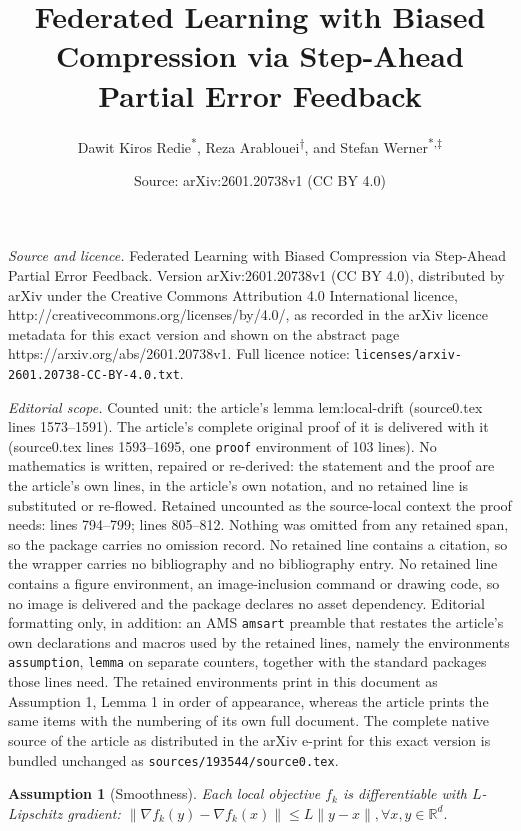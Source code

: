 \documentclass[10pt,a4paper]{amsart}
\title{Federated Learning with Biased Compression via Step-Ahead Partial Error Feedback}
\author{Dawit Kiros Redie\textsuperscript{*}, Reza Arablouei\textsuperscript{$\dagger$}, and Stefan Werner\textsuperscript{*,$\ddagger$}}
\date{Source: arXiv:2601.20738v1 (CC BY 4.0)}
\newtheorem{assumption}{Assumption}
\begin{document}
\maketitle

\noindent\emph{Source and licence.} Federated Learning with Biased Compression via Step-Ahead Partial Error Feedback. Version arXiv:2601.20738v1 (CC BY 4.0), distributed by arXiv under the Creative Commons Attribution 4.0 International licence, http://creativecommons.org/licenses/by/4.0/, as recorded in the arXiv licence metadata for this exact version and shown on the abstract page https://arxiv.org/abs/2601.20738v1. Full licence notice: \texttt{licenses/arxiv-2601.20738-CC-BY-4.0.txt}.\par\smallskip

\noindent\textit{Editorial scope.} Counted unit: the article's lemma lem:local-drift (source0.tex lines 1573--1591). The article's complete original proof of it is delivered with it (source0.tex lines 1593--1695, one \texttt{proof} environment of 103 lines). No mathematics is written, repaired or re-derived: the statement and the proof are the article's own lines, in the article's own notation, and no retained line is substituted or re-flowed.  Retained uncounted as the source-local context the proof needs: lines 794--799; lines 805--812.  Nothing was omitted from any retained span, so the package carries no omission record.  No retained line contains a citation, so the wrapper carries no bibliography and no bibliography entry.  No retained line contains a figure environment, an image-inclusion command or drawing code, so no image is delivered and the package declares no asset dependency.  Editorial formatting only, in addition: an AMS \texttt{amsart} preamble that restates the article's own declarations and macros used by the retained lines, namely the environments \texttt{assumption}, \texttt{lemma} on separate counters, together with the standard packages those lines need.  The retained environments print in this document as Assumption 1, Lemma 1 in order of appearance, whereas the article prints the same items with the numbering of its own full document.  The complete native source of the article as distributed in the arXiv e-print for this exact version is bundled unchanged as \texttt{sources/193544/source0.tex}.
\begin{assumption}[Smoothness]\label{A1}
Each local objective $f_k$ is differentiable with $L$-Lipschitz gradient: 
\(
\bigl\|\nabla f_k(y)-\nabla f_k(x)\bigr\|\le L\|y-x\|, \forall x,y\in\mathbb R^d.
\)
\end{assumption}
\end{document}
